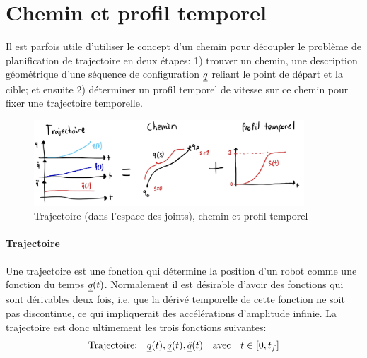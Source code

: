 


\section{Chemin et profil temporel}
\label{sec:chemin}


Il est parfois utile d'utiliser le concept d'un chemin pour découpler le problème de planification de trajectoire en deux étapes: 1) trouver un chemin, une description géométrique d'une séquence de configuration $\underline{q}$ reliant le point de départ et la cible; et ensuite 2) déterminer un profil temporel de vitesse sur ce chemin pour fixer une trajectoire temporelle.

\begin{figure}[htbp]
	\centering
		\includegraphics[width=0.90\textwidth]{fig/traj_path.jpg}
	\caption{Trajectoire (dans l'espace des joints), chemin et profil temporel}
	\label{fig:traj_path}
\end{figure}

\paragraph{Trajectoire} Une trajectoire est une fonction qui détermine la position d'un robot comme une fonction du temps $\underline{q}(t)$. Normalement il est désirable d'avoir des fonctions qui sont dérivables deux fois, i.e. que la dérivé temporelle de cette fonction ne soit pas discontinue, ce qui impliquerait des accélérations d'amplitude infinie. La trajectoire est donc ultimement les trois fonctions suivantes:
\begin{align}
    \text{Trajectoire:} \quad \underline{q}(t), \underline{\dot{q}}(t), \underline{\ddot{q}}(t) \quad \text{avec} \quad t \in [0,t_f]
\end{align}

